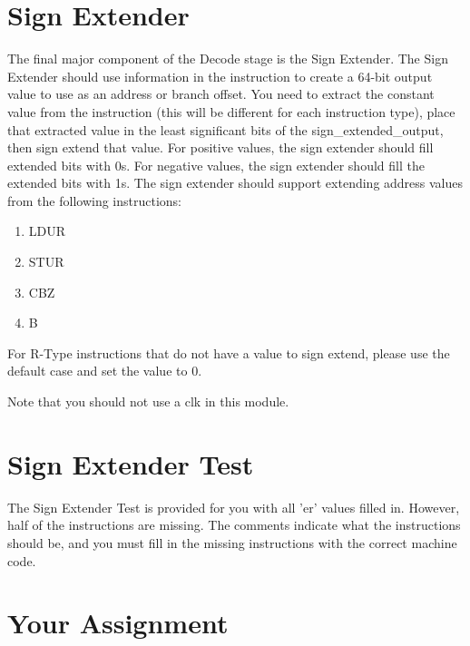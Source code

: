\section{Sign Extender}
The final major component of the Decode stage is the Sign Extender.  The Sign Extender should use information in the instruction to create a 64-bit output value to use as an address or branch offset.  You need to extract the constant value from the instruction (this will be different for each instruction type), place that extracted value in the least significant bits of the sign\_extended\_output, then sign extend that value.  For positive values, the sign extender should fill extended bits with 0s.  For negative values, the sign extender should fill the extended bits with 1s.  The sign extender should support extending address values from the following instructions:
\begin{enumerate}
	\item LDUR
	\item STUR
	\item CBZ
	\item B
\end{enumerate}
For R-Type instructions that do not have a value to sign extend, please use the default case and set the value to 0.

Note that you should not use a clk in this module.

\section{Sign Extender Test}
The Sign Extender Test is provided for you with all 'er' values filled in.  However, half of the instructions are missing.  The comments indicate what the instructions should be, and you must fill in the missing instructions with the correct machine code.

\clearpage
\section{Your Assignment}

